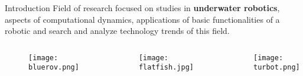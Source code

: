 \begin{frame}[t]{Introduction} 
    \transdissolve[duration=0.5]
    Field of research focused on studies in \textbf{underwater robotics}, aspects of computational dynamics, applications of basic functionalities of a robotic and search and analyze technology trends of this field.

   
        \begin{columns}[t]
            
            \begin{center}
            \begin{figure}
                \texttt{[image: bluerov.png]}
               
               
                  
               
            \end{figure}

            \end{center}
            \vspace*{0.6cm}
            \begin{center}
          
                \begin{figure}
                    
                    \texttt{[image: flatfish.jpg]}
                \end{figure}
            \end{center}
            
            \begin{center}
            \vspace*{0.4cm}
            \begin{figure}
                \texttt{[image: turbot.png]}
            \end{figure}
            \end{center}
        \end{columns}
\end{frame}
